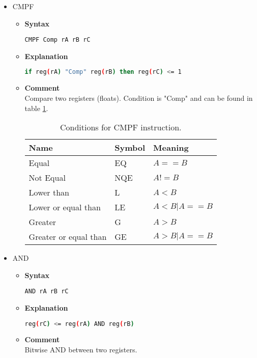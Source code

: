 \begin{itemize}
\begin{itemize}
    \end{itemize}

    \item CMPF
    \begin{itemize}
        \item \textbf{Syntax}
        \begin{lstlisting}[language={[markII]Assembler}, frame=single]
    CMPF Comp rA rB rC
        \end{lstlisting}
        \item \textbf{Explanation}
        \begin{lstlisting}[language=bash, frame=single]
    if reg(rA) "Comp" reg(rB) then reg(rC) <= 1
        \end{lstlisting}
        \item \textbf{Comment} \\
    Compare two registers (floats). Condition is "Comp" and can be found in table \ref{tab:cmp_conds_f}.

    \begin{table}[h]
        \centering
        \begin{tabular}{|l|l|l|}
            \hline
            \textbf{Name}             & \textbf{Symbol} & \textbf{Meaning}      \\ \hline
            Equal                     & EQ              & $A==B$                \\ \hline
            Not Equal                 & NQE             & $A!=B$                \\ \hline
            Lower than                & L               & $A<B$                 \\ \hline
            Lower or equal than       & LE              & $A<B | A==B$          \\ \hline
            Greater                   & G               & $A>B$                 \\ \hline
            Greater or equal than     & GE              & $A>B | A==B$          \\ \hline
        \end{tabular}
        \caption{Conditions for CMPF instruction.}
        \label{tab:cmp_conds_f}
    \end{table}

    \end{itemize}

    \item AND
    \begin{itemize}
        \item \textbf{Syntax}
        \begin{lstlisting}[language={[markII]Assembler}, frame=single]
    AND rA rB rC
        \end{lstlisting}
        \item \textbf{Explanation}
        \begin{lstlisting}[language=bash, frame=single]
    reg(rC) <= reg(rA) AND reg(rB)
        \end{lstlisting}
        \item \textbf{Comment} \\
    Bitwise AND between two registers.
    \end{itemize}


\end{itemize}
